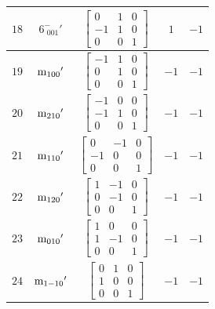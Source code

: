 \documentclass[fleqn,8pt]{jsarticle}
\begin{document}
\begin{longtable}{ccccc}
$ 18 $ & $ 6^{-}_{\,\,001}{}' $ & $ \begin{bmatrix} 0 & 1 & 0 \\ -1 & 1 & 0 \\ 0 & 0 & 1 \end{bmatrix} $ & $ 1 $ & $ -1 $ \\ \hline
$ 19 $ & $ {\rm m}_{100}{}' $ & $ \begin{bmatrix} -1 & 1 & 0 \\ 0 & 1 & 0 \\ 0 & 0 & 1 \end{bmatrix} $ & $ -1 $ & $ -1 $ \\ \hline
$ 20 $ & $ {\rm m}_{210}{}' $ & $ \begin{bmatrix} -1 & 0 & 0 \\ -1 & 1 & 0 \\ 0 & 0 & 1 \end{bmatrix} $ & $ -1 $ & $ -1 $ \\ \hline
$ 21 $ & $ {\rm m}_{110}{}' $ & $ \begin{bmatrix} 0 & -1 & 0 \\ -1 & 0 & 0 \\ 0 & 0 & 1 \end{bmatrix} $ & $ -1 $ & $ -1 $ \\ \hline
$ 22 $ & $ {\rm m}_{120}{}' $ & $ \begin{bmatrix} 1 & -1 & 0 \\ 0 & -1 & 0 \\ 0 & 0 & 1 \end{bmatrix} $ & $ -1 $ & $ -1 $ \\ \hline
$ 23 $ & $ {\rm m}_{010}{}' $ & $ \begin{bmatrix} 1 & 0 & 0 \\ 1 & -1 & 0 \\ 0 & 0 & 1 \end{bmatrix} $ & $ -1 $ & $ -1 $ \\ \hline
$ 24 $ & $ {\rm m}_{1-10}{}' $ & $ \begin{bmatrix} 0 & 1 & 0 \\ 1 & 0 & 0 \\ 0 & 0 & 1 \end{bmatrix} $ & $ -1 $ & $ -1 $ \\
\end{longtable}
\end{document}
